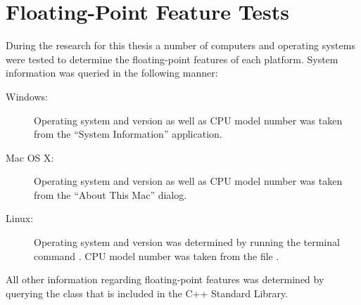 \chapter{Floating-Point Feature Tests}
\label{app:features}
During the research for this thesis a number of computers and operating systems were tested to determine the floating-point features of each platform. System information was queried in the following manner:

\begin{description}
  \item[Windows:] Operating system and version as well as CPU model number was taken from the ``System Information'' application.
  \item[Mac OS X:] Operating system and version as well as CPU model number was taken from the ``About This Mac'' dialog.
  \item[Linux:] Operating system and version was determined by running the terminal command . CPU model number was taken from the file .
\end{description}

All other information regarding floating-point features was determined by querying the  class that is included in the C++ Standard Library.

\newpage


\newpage


\newpage


\newpage


\newpage


\newpage
